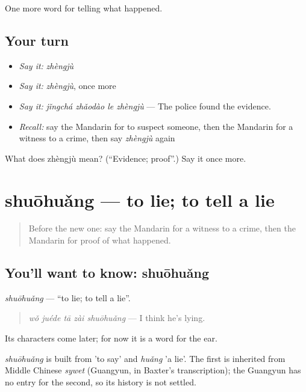 \begin{grammarlens}[title={What you've built}]
One more word for telling what happened.
\end{grammarlens}

\subsection*{Your turn}
\begin{itemize}
\raggedright
  \item \emph{Say it:} \emph{zhèngjù}
  \item \emph{Say it:} \emph{zhèngjù}, once more
  \item \emph{Say it:} \emph{jǐngchá zhǎodào le zhèngjù} — The police found the evidence.
  \item \emph{Recall:} say the Mandarin for to suspect someone, then the Mandarin for a witness to a crime, then say \emph{zhèngjù} again
\end{itemize}

\begin{tcolorbox}[breakable,colback=teal!4,colframe=teal!35!black,title={Before you move on}]
What does zhèngjù mean? (\textquotedblleft{}Evidence; proof\textquotedblright{}.) Say it once more.
\end{tcolorbox}
\section[shuōhuǎng]{shuōhuǎng — to lie; to tell a lie}

\label{lesson:ZH-C310-shuohuang}



\begin{quote}
Before the new one: say the Mandarin for a witness to a crime, then the Mandarin for proof of what happened.
\end{quote}

\subsection*{You'll want to know: shuōhuǎng}
\emph{shuōhuǎng} — \textquotedblleft{}to lie; to tell a lie\textquotedblright{}.

\begin{quote}
\emph{wǒ juéde tā zài shuōhuǎng} — I think he's lying.
\end{quote}

Its characters come later; for now it is a word for the ear.

\begin{cousinweb}
\emph{shuōhuǎng} is built from  'to say' and \emph{huǎng} 'a lie'. The first is inherited from Middle Chinese \emph{sywet} (Guangyun, in Baxter's transcription); the Guangyun has no entry for the second, so its history is not settled.
\end{cousinweb}

